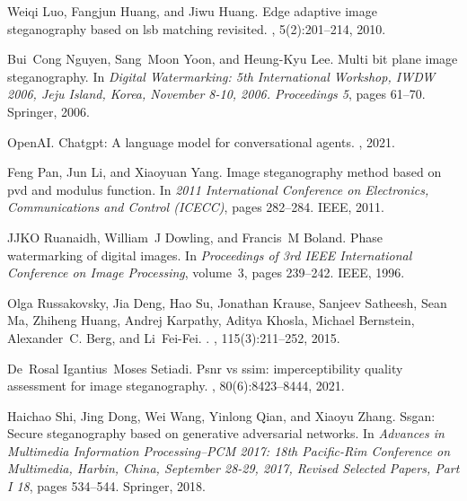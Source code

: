 \documentclass{article}
\begin{document}
\begin{thebibliography}{}
	Weiqi Luo, Fangjun Huang, and Jiwu Huang.
	\newblock Edge adaptive image steganography based on lsb matching revisited.
	,
	5(2):201--214, 2010.
	
	Bui~Cong Nguyen, Sang~Moon Yoon, and Heung-Kyu Lee.
	\newblock Multi bit plane image steganography.
	\newblock In {\em Digital Watermarking: 5th International Workshop, IWDW 2006,
		Jeju Island, Korea, November 8-10, 2006. Proceedings 5}, pages 61--70.
	Springer, 2006.
	
	OpenAI.
	\newblock Chatgpt: A language model for conversational agents.
	, 2021.
	
	Feng Pan, Jun Li, and Xiaoyuan Yang.
	\newblock Image steganography method based on pvd and modulus function.
	\newblock In {\em 2011 International Conference on Electronics, Communications
		and Control (ICECC)}, pages 282--284. IEEE, 2011.
	
	JJKO Ruanaidh, William~J Dowling, and Francis~M Boland.
	\newblock Phase watermarking of digital images.
	\newblock In {\em Proceedings of 3rd IEEE International Conference on Image
		Processing}, volume~3, pages 239--242. IEEE, 1996.
	
	Olga Russakovsky, Jia Deng, Hao Su, Jonathan Krause, Sanjeev Satheesh, Sean Ma,
	Zhiheng Huang, Andrej Karpathy, Aditya Khosla, Michael Bernstein,
	Alexander~C. Berg, and Li~Fei-Fei.
	.
	,
	115(3):211--252, 2015.
	
	De~Rosal Igantius~Moses Setiadi.
	\newblock Psnr vs ssim: imperceptibility quality assessment for image
	steganography.
	, 80(6):8423--8444, 2021.
	
	Haichao Shi, Jing Dong, Wei Wang, Yinlong Qian, and Xiaoyu Zhang.
	\newblock Ssgan: Secure steganography based on generative adversarial networks.
	\newblock In {\em Advances in Multimedia Information Processing--PCM 2017: 18th
		Pacific-Rim Conference on Multimedia, Harbin, China, September 28-29, 2017,
		Revised Selected Papers, Part I 18}, pages 534--544. Springer, 2018.
	

\end{thebibliography}
\end{document}
